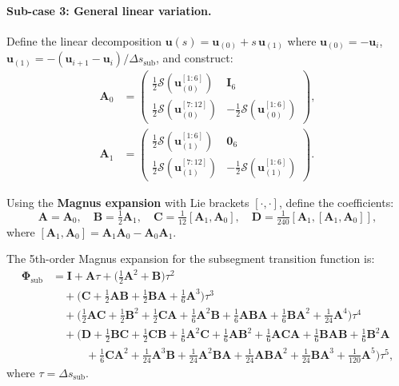 \documentclass[11pt,a4paper]{article}
\newcommand{\curly}[1]{\mathcal{S}\!\left(#1\right)}
\newcommand{\bPhi}{\bm{\Phi}}
\newcommand{\bA}{\mathbf{A}}
\newcommand{\bB}{\mathbf{B}}
\newcommand{\bC}{\mathbf{C}}
\newcommand{\bD}{\mathbf{D}}
\newcommand{\bI}{\mathbf{I}}
\newcommand{\bzero}{\mathbf{0}}
\begin{document}
\paragraph{Sub-case 3: General linear variation.}
Define the linear decomposition $\mathbf{u}(s) = \mathbf{u}_{(0)} + s\,\mathbf{u}_{(1)}$ where
$\mathbf{u}_{(0)} = -\mathbf{u}_i$, \;
$\mathbf{u}_{(1)} = -(\mathbf{u}_{i+1} - \mathbf{u}_i)/\Delta s_{\mathrm{sub}}$,
and construct:
\begin{align}
    \bA_0 &= \begin{pmatrix} \tfrac{1}{2}\curly{\mathbf{u}_{(0)}^{[1:6]}} & \bI_6 \\ \tfrac{1}{2}\curly{\mathbf{u}_{(0)}^{[7:12]}} & -\tfrac{1}{2}\curly{\mathbf{u}_{(0)}^{[1:6]}} \end{pmatrix}, \label{eq:A0}\\[4pt]
    \bA_1 &= \begin{pmatrix} \tfrac{1}{2}\curly{\mathbf{u}_{(1)}^{[1:6]}} & \bzero_6 \\ \tfrac{1}{2}\curly{\mathbf{u}_{(1)}^{[7:12]}} & -\tfrac{1}{2}\curly{\mathbf{u}_{(1)}^{[1:6]}} \end{pmatrix}. \label{eq:A1}
\end{align}

Using the \textbf{Magnus expansion} with Lie brackets $[\cdot,\cdot]$, define the coefficients:
\begin{equation}
    \bA = \bA_0, \quad \bB = \tfrac{1}{2}\bA_1, \quad \bC = \tfrac{1}{12}[\bA_1, \bA_0], \quad \bD = \tfrac{1}{240}[\bA_1, [\bA_1, \bA_0]],
    \label{eq:magnus-coeff}
\end{equation}
where $[\bA_1, \bA_0] = \bA_1 \bA_0 - \bA_0 \bA_1$.

The 5th-order Magnus expansion for the subsegment transition function is:
\begin{align}
    \bPhi_{\mathrm{sub}} &= \bI + \bA\tau + \bigl(\tfrac{1}{2}\bA^2 + \bB\bigr)\tau^2 \nonumber\\
    &\quad + \bigl(\bC + \tfrac{1}{2}\bA\bB + \tfrac{1}{2}\bB\bA + \tfrac{1}{6}\bA^3\bigr)\tau^3 \nonumber\\
    &\quad + \bigl(\tfrac{1}{2}\bA\bC + \tfrac{1}{2}\bB^2 + \tfrac{1}{2}\bC\bA + \tfrac{1}{6}\bA^2\bB + \tfrac{1}{6}\bA\bB\bA + \tfrac{1}{6}\bB\bA^2 + \tfrac{1}{24}\bA^4\bigr)\tau^4 \nonumber\\
    &\quad + \bigl(\bD + \tfrac{1}{2}\bB\bC + \tfrac{1}{2}\bC\bB + \tfrac{1}{6}\bA^2\bC + \tfrac{1}{6}\bA\bB^2 + \tfrac{1}{6}\bA\bC\bA + \tfrac{1}{6}\bB\bA\bB + \tfrac{1}{6}\bB^2\bA \nonumber\\
    &\qquad\quad + \tfrac{1}{6}\bC\bA^2 + \tfrac{1}{24}\bA^3\bB + \tfrac{1}{24}\bA^2\bB\bA + \tfrac{1}{24}\bA\bB\bA^2 + \tfrac{1}{24}\bB\bA^3 + \tfrac{1}{120}\bA^5\bigr)\tau^5, \label{eq:phi-magnus}
\end{align}
where $\tau = \Delta s_{\mathrm{sub}}$.
\end{document}
